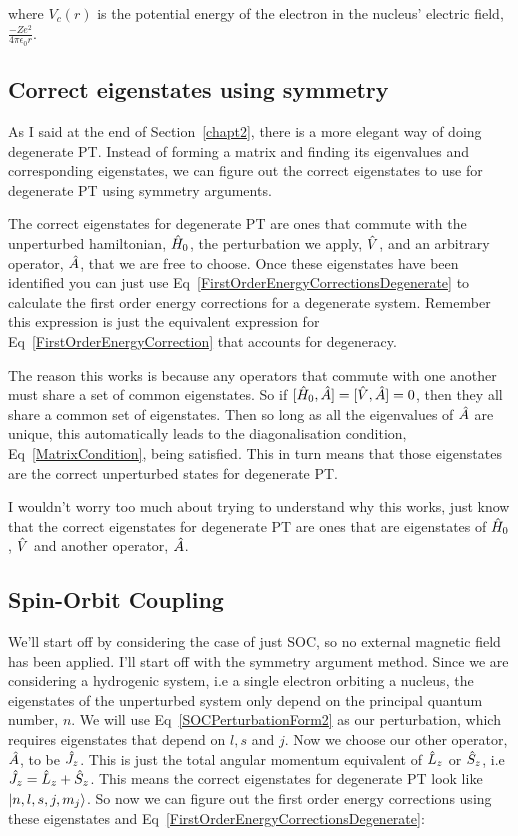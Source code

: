 \noindent where $V_c(r)$ is the potential energy of the electron in the nucleus' electric field, $\frac{-Ze^2}{4\pi\epsilon_0 r}$.

\subsection{Correct eigenstates using symmetry}

As I said at the end of Section~\ref{chapt2}, there is a more elegant way of doing degenerate PT. Instead of forming a matrix and finding its eigenvalues and corresponding eigenstates, we can figure out the correct eigenstates to use for degenerate PT using symmetry arguments.

\noindent The correct eigenstates for degenerate PT are ones that commute with the unperturbed hamiltonian, $\Hat{H}_0$, the perturbation we apply, $\Hat{V}$, and an arbitrary operator, $\Hat{A}$, that we are free to choose. Once these eigenstates have been identified you can just use Eq~\ref{FirstOrderEnergyCorrectionsDegenerate} to calculate the first order energy corrections for a degenerate system. Remember this expression is just the equivalent expression for Eq~\ref{FirstOrderEnergyCorrection} that accounts for degeneracy.

\noindent The reason this works is because any operators that commute with one another must share a set of common eigenstates. So if $[\Hat{H}_0, \Hat{A}] = [\Hat{V}, \Hat{A}] = 0$, then they all share a common set of eigenstates. Then so long as all the eigenvalues of $\Hat{A}$ are unique, this automatically leads to the diagonalisation condition, Eq~\ref{MatrixCondition}, being satisfied. This in turn means that those eigenstates are the correct unperturbed states for degenerate PT.

\noindent I wouldn't worry too much about trying to understand why this works, just know that the correct eigenstates for degenerate PT are ones that are eigenstates of $\Hat{H}_0$, $\Hat{V}$ and another operator, $\Hat{A}$.

\subsection{Spin-Orbit Coupling}

We'll start off by considering the case of just SOC, so no external magnetic field has been applied. I'll start off with the symmetry argument method. Since we are considering a hydrogenic system, i.e a single electron orbiting a nucleus, the eigenstates of the unperturbed system only depend on the principal quantum number, $n$. We will use Eq~\ref{SOCPerturbationForm2} as our perturbation, which requires eigenstates that depend on $l, s$ and $j$. Now we choose our other operator, $\Hat{A}$, to be $\Hat{J}_z$. This is just the total angular momentum equivalent of $\Hat{L}_z$ or $\Hat{S}_z$, i.e $\Hat{J}_z = \Hat{L}_z + \Hat{S}_z$. This means the correct eigenstates for degenerate PT look like $\ket{n, l, s, j, m_j}$. So now we can figure out the first order energy corrections using these eigenstates and Eq~\ref{FirstOrderEnergyCorrectionsDegenerate}:

